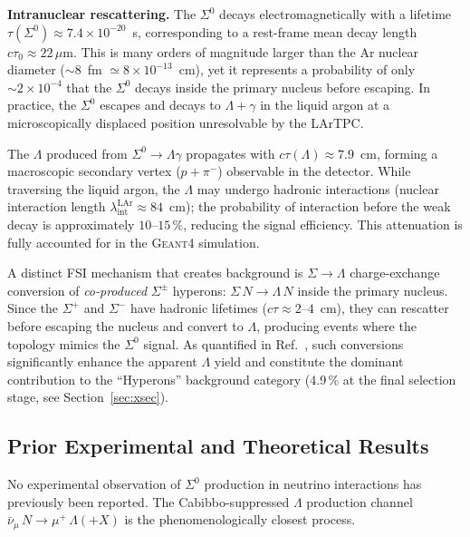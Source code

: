 \documentclass[12pt,a4paper]{article}
\begin{document}
\textbf{Intranuclear rescattering.}
The $\Sigma^0$ decays electromagnetically with a lifetime
$\tau(\Sigma^0)\approx7.4\times10^{-20}$~s, corresponding to a
rest-frame mean decay length $c\tau_0\approx22\,\mu$m.  This is many
orders of magnitude larger than the Ar nuclear diameter
($\sim8$~fm $\simeq8\times10^{-13}$~cm), yet it represents a
probability of only $\sim2\times10^{-4}$ that the $\Sigma^0$ decays
inside the primary nucleus before escaping.  In practice, the $\Sigma^0$
escapes and decays to $\Lambda+\gamma$ in the liquid argon at a
microscopically displaced position unresolvable by the LArTPC.

The $\Lambda$ produced from $\Sigma^0\to\Lambda\gamma$ propagates with
$c\tau(\Lambda)\approx7.9$~cm, forming a macroscopic secondary vertex
($p+\pi^-$) observable in the detector.  While traversing the liquid
argon, the $\Lambda$ may undergo hadronic interactions (nuclear
interaction length $\lambda_\text{int}^\text{LAr}\approx84$~cm); the
probability of interaction before the weak decay is approximately
$10$--$15\,\%$, reducing the signal efficiency.  This attenuation is
fully accounted for in the \textsc{Geant4} simulation.

A distinct FSI mechanism that creates background is
$\Sigma\to\Lambda$ charge-exchange conversion of
\emph{co-produced} $\Sigma^{\pm}$ hyperons:
$\Sigma\,N\to\Lambda\,N$ inside the primary nucleus.
Since the $\Sigma^+$ and $\Sigma^-$ have hadronic lifetimes
($c\tau\approx2$--$4$~cm), they can rescatter before escaping
the nucleus and convert to $\Lambda$, producing events where the
topology mimics the $\Sigma^0$ signal.  As quantified in
Ref.~\cite{Thorpe:2020sbx}, such conversions significantly
enhance the apparent $\Lambda$ yield and constitute the dominant
contribution to the ``Hyperons'' background category
(4.9\,\% at the final selection stage, see Section~\ref{sec:xsec}).

\subsection{Prior Experimental and Theoretical Results}
\label{sec:prior}

No experimental observation of $\Sigma^0$ production in neutrino
interactions has previously been reported.  The Cabibbo-suppressed
$\Lambda$ production channel
$\bar\nu_\mu\,N\to\mu^+\,\Lambda(+X)$ is the phenomenologically
closest process.
\end{document}
